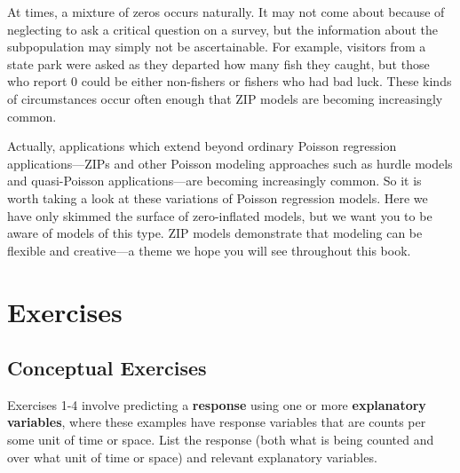 \documentclass[
]{krantz}
\begin{document}
At times, a mixture of zeros occurs naturally. It may not come about because of neglecting to ask a critical question on a survey, but the information about the subpopulation may simply not be ascertainable. For example, visitors from a state park were asked as they departed how many fish they caught, but those who report 0 could be either non-fishers or fishers who had bad luck. These kinds of circumstances occur often enough that ZIP models are becoming increasingly common.

Actually, applications which extend beyond ordinary Poisson regression applications---ZIPs and other Poisson modeling approaches such as hurdle models and quasi-Poisson applications---are becoming increasingly common. So it is worth taking a look at these variations of Poisson regression models. Here we have only skimmed the surface of zero-inflated models, but we want you to be aware of models of this type. ZIP models demonstrate that modeling can be flexible and creative---a theme we hope you will see throughout this book.

\hypertarget{exercises-3}{%
\section{Exercises}\label{exercises-3}}

\hypertarget{exer:concept}{%
\subsection{Conceptual Exercises}\label{exer:concept}}

Exercises 1-4 involve predicting a \textbf{response} using one or more \textbf{explanatory variables}, where these examples have response variables that are counts per some unit of time or space. List the response (both what is being counted and over what unit of time or space) and relevant explanatory variables.
\end{document}
